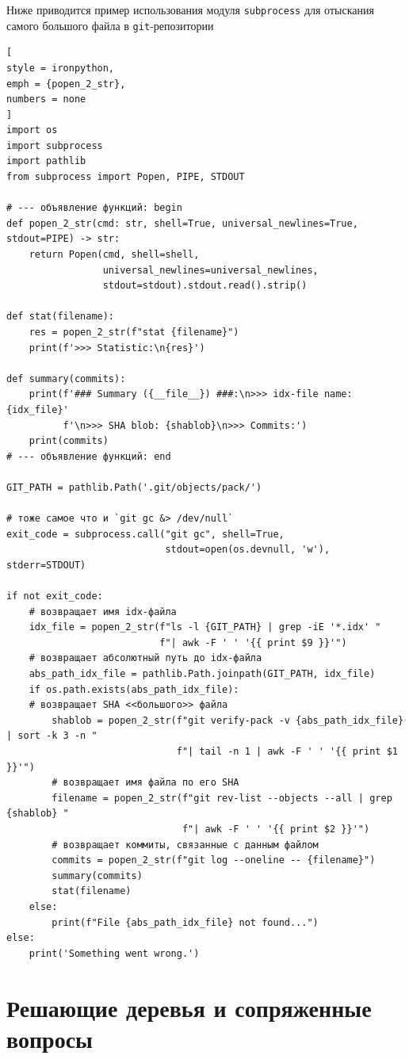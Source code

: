 \documentclass[%
	11pt,
	a4paper,
	utf8,
		]{article}
\begin{document}
Ниже приводится пример использования модуля \texttt{subprocess} для отыскания самого большого файла в \texttt{git}-репозитории
\begin{lstlisting}[
style = ironpython,
emph = {popen_2_str},
numbers = none
]
import os
import subprocess
import pathlib
from subprocess import Popen, PIPE, STDOUT

# --- объявление функций: begin
def popen_2_str(cmd: str, shell=True, universal_newlines=True, stdout=PIPE) -> str:
    return Popen(cmd, shell=shell,
                 universal_newlines=universal_newlines,
                 stdout=stdout).stdout.read().strip()

def stat(filename):
    res = popen_2_str(f"stat {filename}")
    print(f'>>> Statistic:\n{res}')

def summary(commits):
    print(f'### Summary ({__file__}) ###:\n>>> idx-file name: {idx_file}'
          f'\n>>> SHA blob: {shablob}\n>>> Commits:')
    print(commits)
# --- объявление функций: end

GIT_PATH = pathlib.Path('.git/objects/pack/')

# тоже самое что и `git gc &> /dev/null`
exit_code = subprocess.call("git gc", shell=True,
                            stdout=open(os.devnull, 'w'), stderr=STDOUT)

if not exit_code:
    # возвращает имя idx-файла
    idx_file = popen_2_str(f"ls -l {GIT_PATH} | grep -iE '*.idx' "
                           f"| awk -F ' ' '{{ print $9 }}'")
    # возвращает абсолютный путь до idx-файла
    abs_path_idx_file = pathlib.Path.joinpath(GIT_PATH, idx_file)
    if os.path.exists(abs_path_idx_file):
    # возвращает SHA <<большого>> файла
        shablob = popen_2_str(f"git verify-pack -v {abs_path_idx_file} | sort -k 3 -n "
                              f"| tail -n 1 | awk -F ' ' '{{ print $1 }}'")
        # возвращает имя файла по его SHA
        filename = popen_2_str(f"git rev-list --objects --all | grep {shablob} "
                               f"| awk -F ' ' '{{ print $2 }}'")
        # возвращает коммиты, связанные с данным файлом
        commits = popen_2_str(f"git log --oneline -- {filename}")
        summary(commits)
        stat(filename)
    else:
        print(f"File {abs_path_idx_file} not found...")
else:
    print('Something went wrong.')
\end{lstlisting}

\section{Решающие деревья и сопряженные вопросы}
\end{document}
